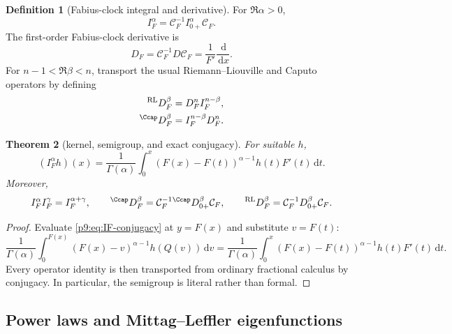 \documentclass[11pt,oneside]{article}
\newtheorem{theorem}{Theorem}[section]
\theoremstyle{definition}
\newtheorem{definition}[theorem]{Definition}
\theoremstyle{remark}
\newcommand{\dd}{\,\mathrm d}
\newcommand{\1}{\mathbf 1}
\begin{document}
\begin{definition}[Fabius-clock integral and derivative]
For $\Re\alpha>0$,
\begin{equation}
 I_F^\alpha=\mathcal C_F^{-1}I_{0+}^\alpha\mathcal C_F.
 \label{p9:eq:IF-conjugacy}
\end{equation}
The first-order Fabius-clock derivative is
\begin{equation}
 D_F=\mathcal C_F^{-1}D\mathcal C_F
 =\frac1{F'}\frac{\dd}{\dd x}.
 \label{p9:eq:DF-conjugacy}
\end{equation}
For $n-1<\Re\beta<n$, transport the usual Riemann--Liouville and Caputo
operators \cite{p9:Caputo1967,p9:Podlubny} by defining
\begin{align}
 {}^{\mathrm{RL}}D_F^\beta
 &=D_F^nI_F^{n-\beta},
 \label{p9:eq:RL-DF}\\
 {}^{\Ccap}D_F^\beta
 &=I_F^{n-\beta}D_F^n.
 \label{p9:eq:Caputo-DF}
\end{align}
\end{definition}

\begin{theorem}[kernel, semigroup, and exact conjugacy]
For suitable $h$,
\begin{equation}
 (I_F^\alpha h)(x)
 =\frac1{\Gamma(\alpha)}
 \int_0^x(F(x)-F(t))^{\alpha-1}h(t)F'(t)\dd t.
 \label{p9:eq:IF-kernel}
\end{equation}
Moreover,
\begin{equation}
 I_F^\alpha I_F^\gamma=I_F^{\alpha+\gamma},
 \qquad
 {}^{\Ccap}D_F^\beta
 =\mathcal C_F^{-1}{}^{\Ccap}D_{0+}^\beta\mathcal C_F,
 \qquad
 {}^{\mathrm{RL}}D_F^\beta
 =\mathcal C_F^{-1}D_{0+}^\beta\mathcal C_F.
 \label{p9:eq:F-clock-conjugacies}
\end{equation}
\end{theorem}

\begin{proof}
Evaluate \cref{p9:eq:IF-conjugacy} at $y=F(x)$ and substitute $v=F(t)$:
\[
 \frac1{\Gamma(\alpha)}\int_0^{F(x)}
 (F(x)-v)^{\alpha-1}h(Q(v))\dd v
 =\frac1{\Gamma(\alpha)}\int_0^x
 (F(x)-F(t))^{\alpha-1}h(t)F'(t)\dd t.
\]
Every operator identity is then transported from ordinary fractional calculus
by conjugacy.  In particular, the semigroup is literal rather than formal.
\end{proof}

\subsection{Power laws and Mittag--Leffler eigenfunctions}
\end{document}

